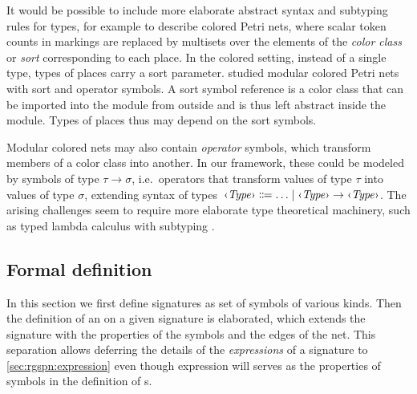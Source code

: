 \begin{remark}\label{rem:rgspn:colored}
  It would be possible to include more elaborate abstract syntax and subtyping rules for types, for example to describe colored Petri nets, where scalar token counts in markings are replaced by multisets over the elements of the \emph{color class} or \emph{sort} corresponding to each place. In the colored setting, instead of a single  type, types of places carry a sort parameter. \citet{Kindler07modular} studied modular colored Petri nets with sort and operator symbols. A sort symbol reference is a color class that can be imported into the module from outside and is thus left abstract inside the module. Types of places thus may depend on the sort symbols.

  Modular colored nets may also contain \emph{operator} symbols, which transform members of a color class into another. In our framework, these could be modeled by symbols of type \(\tau \to \sigma\), i.e.~operators that transform values of type \(\tau\) into values of type \(\sigma\), extending syntax of types~\(\ebnfVar{Type} \ebnfEq \ldots \mid \ebnfVar{Type} \to \ebnfVar{Type}\). The arising challenges seem to require more elaborate type theoretical machinery, such as typed lambda calculus with subtyping .
\end{remark}

\subsection{Formal definition}

In this section we first define  signatures as set of symbols of various kinds. Then the definition of an  on a given signature is elaborated, which extends the signature with the properties of the symbols and the edges of the net. This separation allows deferring the details of the \emph{expressions} of a signature to \vref{sec:rgspn:expression} even though expression will serves as the properties of symbols in the definition of s.

